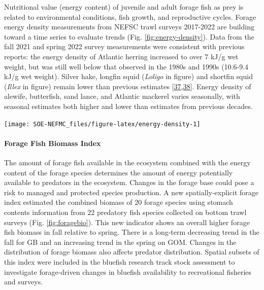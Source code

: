 \documentclass[
  10pt,
]{article}
\let\origfigure\figure
\let\endorigfigure\endfigure
\renewenvironment{figure}[1][2] {
    \expandafter\origfigure\expandafter[H]
} {
    \endorigfigure
}
\begin{document}
Nutritional value (energy content) of juvenile and adult forage fish as prey is related to environmental conditions, fish growth, and reproductive cycles. Forage energy density measurements from NEFSC trawl surveys 2017-2022 are building toward a time series to evaluate trends (Fig. \ref{fig:energy-density}). Data from the fall 2021 and spring 2022 survey measurements were consistent with previous reports: the energy density of Atlantic herring increased to over 7 kJ/g wet weight, but was still well below that observed in the 1980s and 1990s (10.6-9.4 kJ/g wet weight). Silver hake, longfin squid (\emph{Loligo} in figure) and shortfin squid (\emph{Illex} in figure) remain lower than previous estimates {[}\protect\hyperlink{ref-steimle_energy_1985}{37},\protect\hyperlink{ref-lawson_important_1998}{38}{]}. Energy density of alewife, butterfish, sand lance, and Atlantic mackerel varies seasonally, with seasonal estimates both higher and lower than estimates from previous decades.

\begin{figure}

{\centering \texttt{[image: SOE-NEFMC\_files/figure-latex/energy-density-1]} 

}

\caption{Forage fish energy density mean and standard deviation by season and year, compared with 1980s (solid line; Steimle and Terranove 1985) and 1990s (dashed line; Lawson et al. 1998) values.}\label{fig:energy-density}
\end{figure}

\hypertarget{forage-fish-biomass-index}{%
\paragraph{Forage Fish Biomass Index}\label{forage-fish-biomass-index}}

The amount of forage fish available in the ecosystem combined with the energy content of the forage species determines the amount of energy potentially available to predators in the ecosystem. Changes in the forage base could pose a risk to managed and protected species production. A new spatially-explicit forage index estimated the combined biomass of 20 forage species using stomach contents information from 22 predatory fish species collected on bottom trawl surveys (Fig. \ref{fig:foragebio}). This new indicator shows an overall higher forage fish biomass in fall relative to spring. There is a long-term decreasing trend in the fall for GB and an increasing trend in the spring on GOM. Changes in the distribution of forage biomass also affects predator distribution. Spatial subsets of this index were included in the bluefish research track stock assessment to investigate forage-driven changes in bluefish availability to recreational fisheries and surveys.
\end{document}
